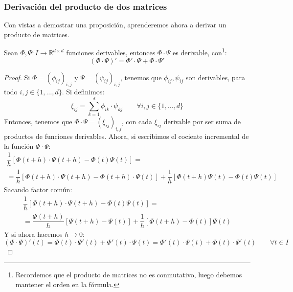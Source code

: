 \subsubsection{Derivación del producto de dos matrices}
Con vistas a demostrar una proposición, aprenderemos ahora a derivar un producto de matrices.
\begin{lema}\label{lema:prop_deriv}
    Sean $\Phi,\Psi:I\rightarrow\mathbb{R}^{d\times d}$ funciones derivables, entonces $\Phi\cdot \Psi$ es derivable, con\footnote{Recordemos que el producto de matrices no es conmutativo, luego debemos mantener el orden en la fórmula.}:
    \begin{equation*}
        (\Phi\cdot \Psi)' = \Phi'\cdot \Psi + \Phi\cdot \Psi'
    \end{equation*}
    \begin{proof}
        Si $\Phi={(\phi_{ij})}_{i,j}$ y $\Psi={(\psi_{ij})}_{i,j}$, tenemos que $\phi_{ij},\psi_{ij}$ son derivables, para todo $i,j\in \{1,\ldots,d\}$. Si definimos:
        \begin{equation*}
            \xi_{ij} = \sum_{k=1}^d \phi_{ik}\cdot  \psi_{kj} \qquad \forall i,j \in \{1,\ldots,d\}
        \end{equation*}
        Entonces, tenemos que $\Phi\cdot \Psi = {(\xi_{ij})}_{i,j}$, con cada $\xi_{ij}$ derivable por ser suma de productos de funciones derivables. Ahora, si escribimos el cociente incremental de la función $\Phi\cdot \Psi$:
        \begin{multline*}
            \dfrac{1}{h}[\Phi(t+h)\cdot \Psi(t+h) - \Phi(t)\Psi(t)] =\\= \dfrac{1}{h} [\Phi(t+h)\cdot \Psi(t+h)-\Phi(t+h)\cdot \Psi(t)] + \dfrac{1}{h} [\Phi(t+h)\Psi(t)-\Phi(t)\Psi(t)]
        \end{multline*}
        Sacando factor común:
        \begin{multline*}
            \dfrac{1}{h}[\Phi(t+h)\cdot \Psi(t+h) - \Phi(t)\Psi(t)] =\\= \dfrac{\Phi(t+h)}{h} [\Psi(t+h)-\Psi(t)] + \dfrac{1}{h} [\Phi(t+h)-\Phi(t)] \Psi(t)
        \end{multline*}
        Y si ahora hacemos $h\rightarrow 0$:
        \begin{equation*}
            (\Phi\cdot \Psi)'(t) = \Phi(t)\cdot \Psi'(t) + \Phi'(t) \cdot \Psi(t) =  \Phi'(t)\cdot \Psi(t) +  \Phi(t) \cdot \Psi'(t)  \qquad \forall t\in I
        \end{equation*}
    \end{proof}
\end{lema}


